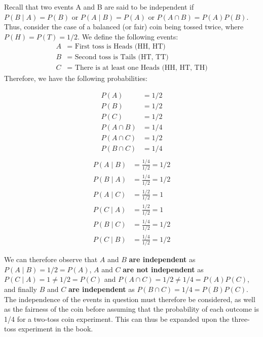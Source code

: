 \documentclass{article}
\begin{document}
	\begin{sol}
		Recall that two events A and B are said to be independent if $P(B \mid A) = P(B)$ or $P(A \mid B) = P(A)$ or $P(A \cap B) = P(A)P(B)$. Thus, consider the case of a balanced (or fair) coin being tossed twice, where $P(H) = P(T) = 1/2$. We define the following events:
		\begin{align*}
			A &= \text{ First toss is Heads (HH, HT)} \\
			B &= \text{ Second toss is Tails (HT, TT)} \\
			C &= \text{ There is at least one Heads (HH, HT, TH)} 
		\end{align*}
		Therefore, we have the following probabilities:
		\begin{multicols}{2}
			\begin{align*}
			P(A) &= 1/2 \\
			P(B) &= 1/2 \\
			P(C) &= 1/2 \\
			P(A \cap B) &= 1/4 \\
			P(A \cap C) &= 1/2 \\
			P(B \cap C) &= 1/4 \\
		\end{align*}
		\begin{align*}
			P (A \mid B) &= \frac{1/4}{1/2} = 1/2\\
			P (B \mid A) &= \frac{1/4}{1/2} = 1/2\\
			P (A \mid C) &= \frac{1/2}{1/2} = 1\\
			P (C \mid A) &= \frac{1/2}{1/2} = 1\\
			P (B \mid C) &= \frac{1/4}{1/2} = 1/2\\
			P (C \mid B) &= \frac{1/4}{1/2} = 1/2
		\end{align*}
		\end{multicols}
		
		We can therefore observe that $A$ and $B$ \textbf{are independent} as $P(A \mid B) = 1/2 = P(A)$, $A$ and $C$ \textbf{are not independent} as $P(C \mid A) = 1 \neq 1/2 = P(C)$ and $P(A \cap C) = 1/2 \neq 1/4 = P(A)P(C)$, and finally $B$ and $C$ \textbf{are independent} as $P(B \cap C) = 1/4 = P(B)P(C)$. The independence of the events in question must therefore be considered, as well as the fairness of the coin before assuming that the probability of each outcome is 1/4 for a two-toss coin experiment. This can thus be expanded upon the three-toss experiment in the book.
	\end{sol}
\pagebreak
\end{document}

